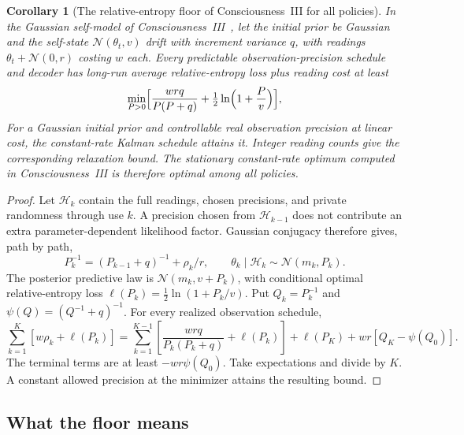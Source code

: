 \documentclass[12pt]{article}
\newtheorem{corollary}[theorem]{Corollary}
\theoremstyle{definition}
\begin{document}
\begin{corollary}[The relative-entropy floor of Consciousness~III for all policies]
\label{cor:c3}
In the Gaussian self-model of Consciousness~III~\cite{Liu2026CIII}, let the initial prior be Gaussian and the self-state $\mathcal N(\theta_t,v)$ drift with increment variance $q$, with readings $\theta_t+\mathcal N(0,r)$ costing $w$ each. Every predictable observation-precision schedule and decoder has long-run average relative-entropy loss plus reading cost at least
\[
\min_{P>0}\Bigl[\frac{wrq}{P(P+q)}+\tfrac12\ln\Bigl(1+\frac Pv\Bigr)\Bigr],
\]
For a Gaussian initial prior and controllable real observation precision at linear cost, the constant-rate Kalman schedule attains it. Integer reading counts give the corresponding relaxation bound. The stationary constant-rate optimum computed in Consciousness~III is therefore optimal among all policies.
\end{corollary}

\begin{proof}
Let $\mathcal H_k$ contain the full readings, chosen precisions, and private
randomness through use $k$. A precision chosen from $\mathcal H_{k-1}$ does
not contribute an extra parameter-dependent likelihood factor. Gaussian
conjugacy therefore gives, path by path,
\[
 P_k^{-1}=(P_{k-1}+q)^{-1}+\rho_k/r,
 \qquad \theta_k\mid\mathcal H_k\sim\mathcal N(m_k,P_k).
\]
The posterior predictive law is $\mathcal N(m_k,v+P_k)$, with conditional
optimal relative-entropy loss $\ell(P_k)=\tfrac12\ln(1+P_k/v)$.
Put $Q_k=P_k^{-1}$ and $\psi(Q)=(Q^{-1}+q)^{-1}$.
For every realized observation schedule,
\[
 \sum_{k=1}^K[w\rho_k+\ell(P_k)]
 =\sum_{k=1}^{K-1}
 \left[\frac{wrq}{P_k(P_k+q)}+\ell(P_k)\right]
 +\ell(P_K)+wr[Q_K-\psi(Q_0)].
\]
The terminal terms are at least $-wr\psi(Q_0)$.
Take expectations and divide by $K$. A constant allowed precision at the
minimizer attains the resulting bound.
\end{proof}

\subsection{What the floor means}
\label{subsec:floor_meaning}
\end{document}
